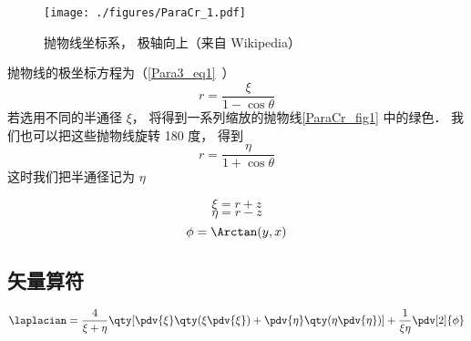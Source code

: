 

\begin{figure}[ht]
\centering
\texttt{[image: ./figures/ParaCr\_1.pdf]}
\caption{抛物线坐标系， 极轴向上（来自 Wikipedia）} \label{ParaCr_fig1}
\end{figure}

抛物线的极坐标方程为（\autoref{Para3_eq1}~）
\begin{equation}
r = \frac{\xi}{1 - \cos \theta }
\end{equation}
若选用不同的半通径 $\xi$， 将得到一系列缩放的抛物线\autoref{ParaCr_fig1} 中的绿色． 我们也可以把这些抛物线旋转 180 度， 得到
\begin{equation}
r = \frac{\eta}{1 + \cos \theta }
\end{equation}
这时我们把半通径记为 $\eta$

\begin{equation}
\xi = r + z
\end{equation}
\begin{equation}
\eta = r - z
\end{equation}
\begin{equation}
\phi = \Arctan(y, x)
\end{equation}

\subsection{矢量算符}
\begin{equation}
\laplacian = \frac{4}{\xi + \eta} \qty[\pdv{\xi}\qty(\xi\pdv{\xi}) + \pdv{\eta}\qty(\eta\pdv{\eta})] + \frac{1}{\xi\eta}\pdv[2]{\phi}
\end{equation}

